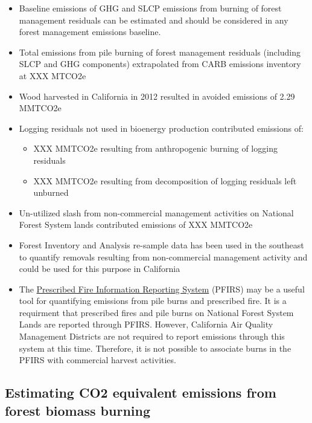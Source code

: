 \documentclass[a4paper]{article}
\begin{document}
\begin{itemize}
\item Baseline emissions of GHG and SLCP emissions from burning of forest
management residuals can be estimated and should be considered in
any forest management emissions baseline.

\item Total emissions from pile burning of forest management residuals
(including SLCP and GHG components) extrapolated from CARB emissions
inventory at XXX MTCO2e

\item Wood harvested in California in 2012 resulted in avoided emissions of
2.29 MMTCO2e

\item Logging residuals not used in bioenergy production contributed
emissions of:
\begin{itemize}
\item XXX MMTCO2e resulting from anthropogenic burning of logging residuals

\item XXX MMTCO2e resulting from decomposition of logging residuals left
unburned
\end{itemize}

\item Un-utilized slash from non-commercial management activities on
National Forest System lands contributed emissions of XXX MMTCO2e

\item Forest Inventory and Analysis re-sample data has been used in the
southeast to quantify removals resulting from non-commercial
management activity and could be used for this purpose in California

\item The \href{https://ssl.arb.ca.gov/pfirs/}{Prescribed Fire Information Reporting System} (PFIRS) may be a useful tool for quantifying
emissions from pile burns and prescribed fire. It is a requirment that prescribed fires and pile
burns on National Forest System Lands are reported through PFIRS. However, California Air Quality Management
Districts are not required to report emissions through this system at this time. Therefore, it is not possible to associate burns in the PFIRS with commercial harvest activities.
\end{itemize}


\subsection{Estimating CO2 equivalent emissions from forest biomass burning}
\label{sec-1-2}
\end{document}
